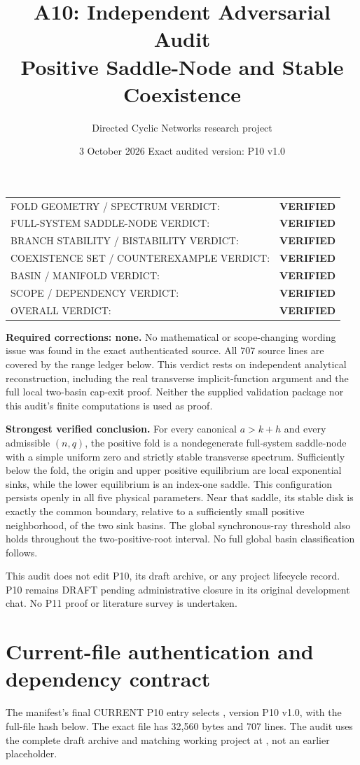 \documentclass[11pt]{article}
\title{A10: Independent Adversarial Audit\\Positive Saddle-Node and Stable Coexistence}
\author{Directed Cyclic Networks research project}
\date{3 October 2026 \quad Exact audited version: P10 v1.0}
\newcommand{\verified}{\textbf{VERIFIED}}
\begin{document}
\maketitle
\begin{tabular}{@{}p{}l@{}}
\toprule
FOLD GEOMETRY / SPECTRUM VERDICT: & \verified\\
FULL-SYSTEM SADDLE-NODE VERDICT: & \verified\\
BRANCH STABILITY / BISTABILITY VERDICT: & \verified\\
COEXISTENCE SET / COUNTEREXAMPLE VERDICT: & \verified\\
BASIN / MANIFOLD VERDICT: & \verified\\
SCOPE / DEPENDENCY VERDICT: & \verified\\
\midrule
OVERALL VERDICT: & \verified\\
\bottomrule
\end{tabular}

\textbf{Required corrections: none.} No mathematical or scope-changing wording
issue was found in the exact authenticated source. All 707 source lines are
covered by the range ledger below. This verdict rests on independent
analytical reconstruction, including the real transverse implicit-function
argument and the full local two-basin cap-exit proof. Neither the supplied
validation package nor this audit's finite computations is used as proof.

\textbf{Strongest verified conclusion.} For every canonical $a>k+h$ and every
admissible $(n,q)$, the positive fold is a nondegenerate full-system
saddle-node with a simple uniform zero and strictly stable transverse
spectrum. Sufficiently below the fold, the origin and upper positive
equilibrium are local exponential sinks, while the lower equilibrium is an
index-one saddle. This configuration persists openly in all five physical
parameters. Near that saddle, its stable disk is exactly the common boundary,
relative to a sufficiently small positive neighborhood, of the two sink
basins. The global synchronous-ray threshold also holds throughout the
two-positive-root interval. No full global basin classification follows.

This audit does not edit P10, its draft archive, or any project lifecycle
record. P10 remains DRAFT pending administrative closure in its original
development chat. No P11 proof or literature survey is undertaken.

\section{Current-file authentication and dependency contract}
\label{sec:auth}
The manifest's final CURRENT P10 entry selects
, version P10 v1.0,
with the full-file hash below. The exact file has 32,560 bytes and 707 lines.
The audit uses the complete draft archive and matching working project at
, not an earlier placeholder.
\end{document}

